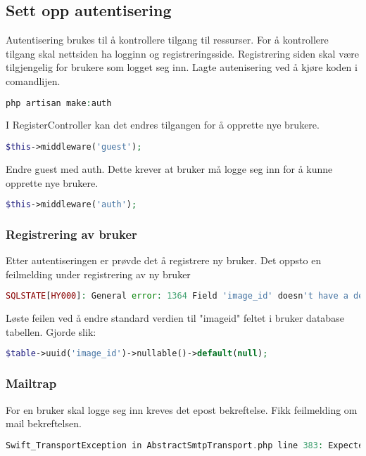 \subsection{Sett opp autentisering}
Autentisering brukes til å kontrollere tilgang til ressurser. For å kontrollere tilgang skal nettsiden ha logginn og registreringsside. Registrering siden skal være tilgjengelig for brukere som logget seg inn. 
Lagte autenisering ved å kjøre koden i comandlijen.
\begin{lstlisting}[language=PHP]
    php artisan make:auth 
\end{lstlisting} 
    
I RegisterController kan det endres tilgangen for å opprette nye brukere.
\begin{lstlisting}[language=PHP]
    $this->middleware('guest');
\end{lstlisting}
Endre guest med auth. Dette krever at bruker må logge seg inn for å kunne opprette nye brukere.
\begin{lstlisting}[language=PHP]
    $this->middleware('auth');
\end{lstlisting}

\subsubsection{ Registrering av bruker}
Etter autentiseringen er prøvde det å registrere ny bruker. Det oppsto en feilmelding under registrering av ny bruker
\begin{lstlisting}[language=PHP]
    SQLSTATE[HY000]: General error: 1364 Field 'image_id' doesn't have a default value
\end{lstlisting}  
Løste feilen ved å endre standard verdien til "imageid" feltet i bruker database tabellen. Gjorde slik:

\begin{lstlisting}[language=PHP]
    $table->uuid('image_id')->nullable()->default(null);
\end{lstlisting} 

\subsubsection{Mailtrap}
For en bruker skal logge seg inn kreves det epost bekreftelse.
Fikk feilmelding om mail bekreftelsen.
\begin{lstlisting}[language=PHP]
    Swift_TransportException in AbstractSmtpTransport.php line 383: Expected response code 250 but got code "530", with message "530 5.7.1 Authentication required
\end{lstlisting}
    
